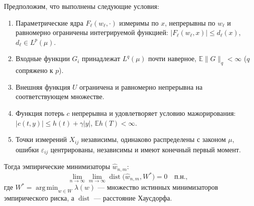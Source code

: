 \documentclass[../NDCNNAI_main.tex]{subfiles}
\begin{document}
\begin{theorem}
Предположим, что выполнены следующие условия:
\begin{enumerate}
    \item[(A1)] Параметрические ядра $F_\ell(w_\ell, \cdot)$ измеримы по $x$, непрерывны по $w_\ell$ и равномерно ограничены интегрируемой функцией: $|F_\ell(w_\ell, x)| \le d_\ell(x)$, $d_\ell \in L^p(\mu)$.
    \item[(A2)] Входные функции $G_i$ принадлежат $L^q(\mu)$ почти наверное, $\mathbb{E}\|G\|_q < \infty$ ($q$ сопряжено к $p$).
    \item[(A3)] Внешняя функция $U$ ограничена и равномерно непрерывна на соответствующем множестве.
    \item[(A4)] Функция потерь $c$ непрерывна и удовлетворяет условию мажорирования: $|c(t,y)| \le h(t) + \gamma|y|$, $\mathbb{E}h(T) < \infty$.
    \item[(A5)] Точки измерений $X_{ij}$ независимы, одинаково распределены с законом $\mu$, ошибки $\varepsilon_{ij}$ центрированы, независимы и имеют конечный первый момент.
\end{enumerate}
Тогда эмпирические минимизаторы $\hat{w}_{n,m}$:
\[
\lim_{n\to\infty} \lim_{m\to\infty} \operatorname{dist}\!\bigl(\hat{w}_{n,m}, W^*\bigr) = 0 \quad \text{п.н.},
\]
где $W^* = \operatorname{arg\,min}_{w\in W} \lambda(w)$ --- множество истинных минимизаторов эмпирического риска, а $\operatorname{dist}$ --- расстояние Хаусдорфа.
\end{theorem}
\end{document}

